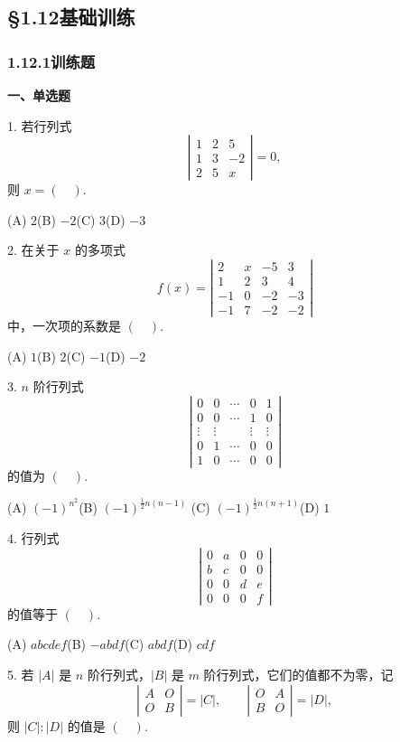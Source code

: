 \documentclass[UTF8,12pt,a4paper,fontset=fandol]{ctexart}
\begin{document}
\subsection*{§1.12\quad 基础训练}

\subsubsection*{1.12.1\quad 训练题}

\noindent\textbf{一、单选题}

1. 若行列式
\[
\left|\begin{array}{ccc}
1&2&5\\
1&3&-2\\
2&5&x
\end{array}\right|=0,
\]
则 $x=(\quad)$.

(A) $2$\qquad (B) $-2$\qquad (C) $3$\qquad (D) $-3$

2. 在关于 $x$ 的多项式
\[
f(x)=\left|\begin{array}{cccc}
2&x&-5&3\\
1&2&3&4\\
-1&0&-2&-3\\
-1&7&-2&-2
\end{array}\right|
\]
中，一次项的系数是 $(\quad)$.

(A) $1$\qquad (B) $2$\qquad (C) $-1$\qquad (D) $-2$

3. $n$ 阶行列式
\[
\left|\begin{array}{ccccc}
0&0&\cdots&0&1\\
0&0&\cdots&1&0\\
\vdots&\vdots&&\vdots&\vdots\\
0&1&\cdots&0&0\\
1&0&\cdots&0&0
\end{array}\right|
\]
的值为 $(\quad)$.

(A) $(-1)^{n^2}$\qquad (B) $(-1)^{\frac12n(n-1)}$\qquad
(C) $(-1)^{\frac12n(n+1)}$\qquad (D) $1$

4. 行列式
\[
\left|\begin{array}{cccc}
0&a&0&0\\
b&c&0&0\\
0&0&d&e\\
0&0&0&f
\end{array}\right|
\]
的值等于 $(\quad)$.

(A) $abcdef$\qquad (B) $-abdf$\qquad (C) $abdf$\qquad (D) $cdf$

5. 若 $|A|$ 是 $n$ 阶行列式，$|B|$ 是 $m$ 阶行列式，它们的值都不为零，记
\[
\left|\begin{array}{cc}A&O\\ O&B\end{array}\right|=|C|,\qquad
\left|\begin{array}{cc}O&A\\ B&O\end{array}\right|=|D|,
\]
则 $|C|:|D|$ 的值是 $(\quad)$.
\end{document}
